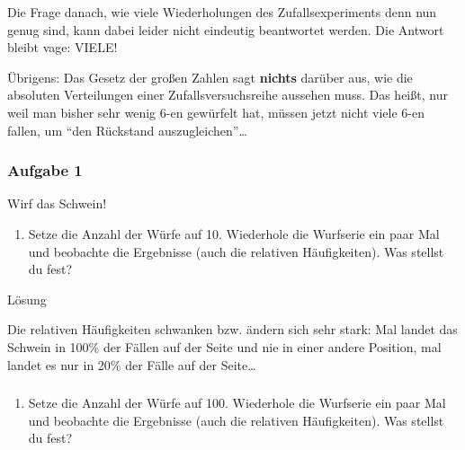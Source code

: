 \documentclass[
  ngerman,
]{book}
\providecommand{\tightlist}{%
  \setlength{\itemsep}{0pt}\setlength{\parskip}{0pt}}
\begin{document}
Die Frage danach, wie viele Wiederholungen des Zufallsexperiments denn nun genug sind, kann dabei leider nicht eindeutig beantwortet werden. Die Antwort bleibt vage: VIELE!

Übrigens: Das Gesetz der großen Zahlen sagt \textbf{nichts} darüber aus, wie die absoluten Verteilungen einer Zufallsversuchsreihe aussehen muss. Das heißt, nur weil man bisher sehr wenig 6-en gewürfelt hat, müssen jetzt nicht viele 6-en fallen, um ``den Rückstand auszugleichen''\ldots{}

\hypertarget{section-74}{%
\subsubsection*{}\label{section-74}}

\hypertarget{aufgabe-1-9}{%
\subsubsection*{Aufgabe 1}\label{aufgabe-1-9}}

Wirf das Schwein!

\begin{enumerate}
\def\labelenumi{\alph{enumi})}
\tightlist
\item
  Setze die Anzahl der Würfe auf 10. Wiederhole die Wurfserie ein paar Mal und beobachte die Ergebnisse (auch die relativen Häufigkeiten). Was stellst du fest?
\end{enumerate}

Lösung

Die relativen Häufigkeiten schwanken bzw. ändern sich sehr stark: Mal landet das Schwein in 100\% der Fällen auf der Seite und nie in einer andere Position, mal landet es nur in 20\% der Fälle auf der Seite\ldots{}

\hypertarget{section-75}{%
\subsubsection*{}\label{section-75}}

\begin{enumerate}
\def\labelenumi{\alph{enumi})}
\setcounter{enumi}{1}
\tightlist
\item
  Setze die Anzahl der Würfe auf 100. Wiederhole die Wurfserie ein paar Mal und beobachte die Ergebnisse (auch die relativen Häufigkeiten). Was stellst du fest?
\end{enumerate}
\end{document}
